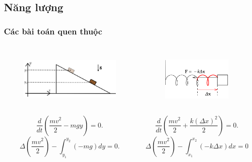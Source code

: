 \subsection{Năng lượng}
\begin{frame}
    \frametitle{Các bài toán quen thuộc}
    \begin{columns}
        \begin{column}{0.5\textwidth}
            \vspace{-14pt}

            \begin{figure}
                \centering
                \includegraphics[width=7cm, height=3cm]{Content/Figure/gravity_energy.png}
            \end{figure}
            \[\frac{d}{dt}\left(\frac{mv^2}{2}-mgy\right)=0.\]
            \[\Delta\left(\frac{mv^2}{2}\right)-\int_{y_1}^{y_2}(-mg)dy=0.\]
        \end{column}
        \begin{column}{0.5\textwidth}
            \vspace{-14pt}

            \begin{figure}
                \centering
                \includegraphics[width=5cm, height=3cm]{Content/Figure/springmass.png}
            \end{figure}
            \[\frac{d}{dt}\left(\frac{mv^2}{2}+\frac{k(\Delta x)^2}{2}\right)=0.\]
             \[\Delta\left(\frac{mv^2}{2}\right)-\int_{ x_1}^{x_2}(-k\Delta x)dx =0.\]
        \end{column}
    \end{columns}
\end{frame}
